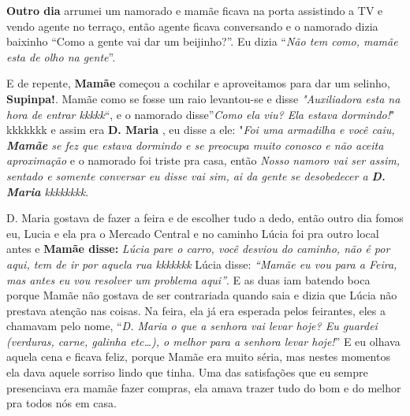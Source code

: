 \documentclass[
  brazil,
  a6paper,
  oneside,
  landscape,
  14pt]{scrbook}
\begin{document}
\textbf{Outro dia} arrumei um namorado e mamãe ficava na porta
assistindo a TV e vendo agente no terraço, então agente ficava
conversando e o namorado dizia baixinho ``Como a gente vai dar um
beijinho?''. Eu dizia ``\emph{Não tem como, mamãe esta de olho na
gente}''.

E de repente, \textbf{Mamãe} começou a cochilar e aproveitamos para dar
um selinho, \textbf{Supinpa!}. Mamãe como se fosse um raio levantou-se e
disse \emph{"Auxiliadora esta na hora de entrar kkkkk}``, e o namorado
disse''\emph{Como ela viu? Ela estava dormindo!}" kkkkkkk e assim era
\textbf{D. Maria} , eu disse a ele: "\emph{Foi uma armadilha e você
caiu, \textbf{Mamãe} se fez que estava dormindo e se preocupa muito
conosco e não aceita aproximação} e o namorado foi triste pra casa,
então \emph{Nosso namoro vai ser assim, sentado e somente conversar eu
disse vai sim, ai da gente se desobedecer a \textbf{D. Maria} kkkkkkkk}.

D. Maria gostava de fazer a feira e de escolher tudo a dedo, então outro
dia fomos eu, Lucia e ela pra o Mercado Central e no caminho Lúcia foi
pra outro local antes e \textbf{Mamãe disse:} \emph{Lúcia pare o carro,
você desviou do caminho, não é por aqui, tem de ir por aquela rua
kkkkkkk} Lúcia disse: \emph{``Mamãe eu vou para a Feira, mas antes eu
vou resolver um problema aqui''}. E as duas iam batendo boca porque
Mamãe não gostava de ser contrariada quando saia e dizia que Lúcia não
prestava atenção nas coisas. Na feira, ela já era esperada pelos
feirantes, eles a chamavam pelo nome, ``\emph{D. Maria o que a senhora
vai levar hoje? Eu guardei (verduras, carne, galinha etc\ldots), o
melhor para a senhora levar hoje!}'' E eu olhava aquela cena e ficava
feliz, porque Mamãe era muito séria, mas nestes momentos ela dava aquele
sorriso lindo que tinha. Uma das satisfações que eu sempre presenciava
era mamãe fazer compras, ela amava trazer tudo do bom e do melhor pra
todos nós em casa.
\end{document}

